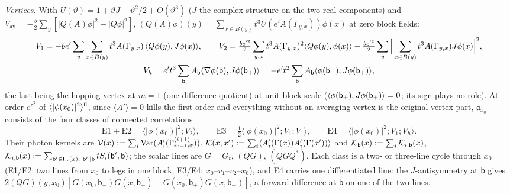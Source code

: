 \emph{Vertices.} With $U(\vartheta)=1+\vartheta J-\vartheta^2/2+O(\vartheta^3)$ ($J$ the complex structure on the two real components) and $V_{\mathrm{av}}=-\frac b2\sum_y[|Q(A)\phi|^2-|Q\phi|^2]$, $(Q(A)\phi)(y)=\sum_{x\in B(y)}t^3U(e'A(\Gamma_{y,x}))\phi(x)$ \cite[(3.24)--(3.26)]{K1} at zero block fields:
\begin{gather*}
V_1=-be'\sum_y\sum_{x\in B(y)}t^3A(\Gamma_{y,x})\,\langle Q\phi(y),J\phi(x)\rangle,\qquad
V_2=\tfrac{be'^2}2\sum_{y,x}t^3A(\Gamma_{y,x})^2\langle Q\phi(y),\phi(x)\rangle-\tfrac{be'^2}2\sum_y\Big|\sum_{x\in B(y)}t^3A(\Gamma_{y,x})J\phi(x)\Big|^2,\\
V_h=e't^3\sum_{\mathsf b}A_{\mathsf b}\langle \nabla\phi(\mathsf b),J\phi(\mathsf b_+)\rangle=-e't^2\sum_{\mathsf b}A_{\mathsf b}\langle \phi(\mathsf b_-),J\phi(\mathsf b_+)\rangle,
\end{gather*}
the last being the hopping vertex \cite[(3.22)]{K1} at $m=1$ (one difference quotient) at unit block scale ($\langle \phi(\mathsf b_+),J\phi(\mathsf b_+)\rangle=0$; its sign plays no role). At order $e'^2$ of $\langle|\phi(x_0)|^2\rangle^{\mathrm{fl}}$, since $\langle A'\rangle=0$ kills the first order and everything without an averaging vertex is the original-vertex part, $\mathfrak a_{x_0}$ consists of the four classes of connected correlations
\[
\mathrm{E1}+\mathrm{E2}=\langle|\phi(x_0)|^2;V_2\rangle,\qquad\mathrm{E3}=\tfrac12\langle|\phi(x_0)|^2;V_1;V_1\rangle,\qquad\mathrm{E4}=\langle|\phi(x_0)|^2;V_1;V_h\rangle.
\]
Their photon kernels are $\mathcal V(x):=\sum_i\operatorname{Var}(A'_i(\Gamma^{(i+1)}_{x_{i+1},x}))$, $\mathcal K(x,x'):=\sum_i\langle A'_i(\Gamma(x))A'_i(\Gamma(x'))\rangle$ and $\mathcal K_{\mathsf b}(x):=\sum_i\mathcal K_{i,\mathsf b}(x)$, $\mathcal K_{i,\mathsf b}(x):=\sum_{\mathsf b'\in\Gamma_i(x),\ \mathsf b'\parallel\mathsf b}tS_i(\mathsf b',\mathsf b)$; the scalar lines are $G=G_t$, $(QG)$, $(QGQ^*)$. Each class is a two- or three-line cycle through $x_0$ (E1/E2: two lines from $x_0$ to legs in one block; E3/E4: $x_0$--$v_1$--$v_2$--$x_0$), and E4 carries one differentiated line: the $J$-antisymmetry at $\mathsf b$ gives $2(QG)(y,x_0)[G(x_0,\mathsf b_-)G(x,\mathsf b_+)-G(x_0,\mathsf b_+)G(x,\mathsf b_-)]$, a forward difference at $\mathsf b$ on one of the two lines.

